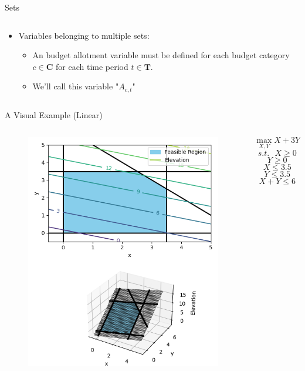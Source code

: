 \documentclass[10pt, aspectratio=169]{beamer}
\begin{document}
\begin{frame}{Sets}
\begin{columns}
\begin{column}{0.5\textwidth}
\begin{itemize}
                \item Variables belonging to multiple sets:
                \begin{itemize}
                    \item An budget allotment variable must be defined for each budget category $c \in \textbf{C}$ for each time period $t \in \textbf{T}$.
                    \item We'll call this variable "$A_{c,t}$"
                \end{itemize}
            \end{itemize}
        \end{column}
    \end{columns}
\end{frame}

\begin{frame}{A Visual Example (Linear)}
    \begin{columns}
        \begin{column}{0.5\textwidth}
            \begin{figure}
                \includegraphics[width=0.8\linewidth]{LinearObjective.png}
            \end{figure}
        \end{column}
        \begin{column}{0.5\textwidth}
            $$\max_{X,Y} X + 3Y - 0.5$$
            $$s.t. \ \ \ X\geq 0$$
            $$Y \geq 0$$
            $$X \leq 3.5$$
            $$Y \leq 3.5$$
            $$X + Y \leq 6$$
        \end{column}
    \end{columns}
\end{frame}
\end{document}
